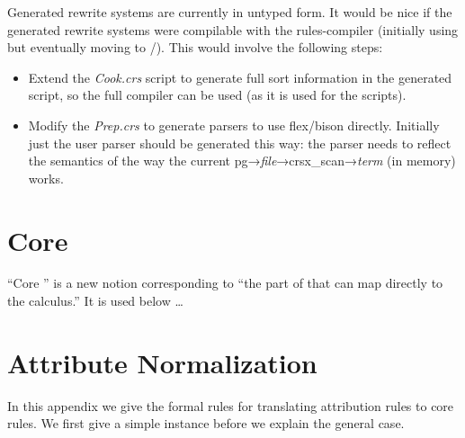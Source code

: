 \documentclass[11pt]{article} %
\begin{document}
Generated  rewrite systems are currently in untyped  form. It would be nice if the
generated rewrite systems were compilable with the \CRSX rules-compiler (initially using  but
eventually moving to /\hax). This would involve the following steps:
\begin{itemize}

\item Extend the \emph{Cook.crs} script to generate full sort information in the generated 
  script, so the  full compiler can be used (as it is used for the \HAX scripts).

\item Modify the \emph{Prep.crs} to generate parsers to use flex/bison directly. Initially just the
  user parser should be generated this way: the parser needs to reflect the semantics of the way the
  current pg→\emph{file}→crsx\_scan→\emph{term} (in memory) works.

\end{itemize}


\appendix\small

\section{Core \HAX}
\label{app:core}

``Core \HAX'' is a new notion corresponding to ``the part of  that can map directly to the \hax
calculus.'' It is used below …


\section{Attribute Normalization}
\label{app:attributes}

In this appendix we give the formal rules for translating attribution rules to core  rules. We
first give a simple instance before we explain the general case.
\end{document}
